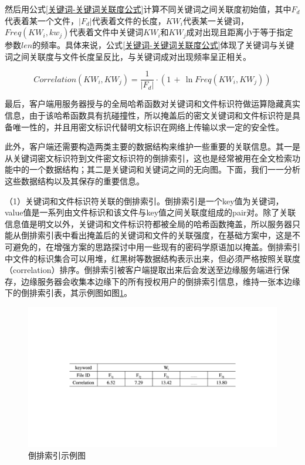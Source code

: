 \documentclass[promaster]{thesis-uestc}
\begin{document}
然后用公式\ref{关键词-关键词关联度公式}计算不同关键词之间关联度初始值，其中$F_d$代表着某一个文件，$|F_d|$代表着文件的长度，$KW_i$代表某一关键词，$Freq(KW_i, kw_j)$代表着文件中关键词$KW_i$和$KW_j$成对出现且距离小于等于指定参数$len$的频率。具体来说，公式\ref{关键词-关键词关联度公式}体现了关键词与关键词之间关联度与文件长度呈反比，与关键词成对出现频率呈正相关。

\begin{equation}
    Correlation(KW_i, KW_j) = \frac{1}{|F_d|} \cdot (1\,+\,\ln{Freq(KW_i, KW_j)})
    \label{关键词-关键词关联度公式}
\end{equation}

最后，客户端用服务器授与的全局哈希函数对关键词和文件标识符做运算隐藏真实信息，由于该哈希函数具有抗碰撞性，所以掩盖后的密文关键词和文件标识符是具备唯一性的，并且用密文标识代替明文标识在网络上传输以求一定的安全性。

此外，客户端还需要构造两类主要的数据结构来维护一些重要的关联信息。其一是从关键词密文标识符到文件密文标识符的倒排索引，这也是经常被用在全文检索功能中的一个数据结构；其二是关键词和关键词之间的无向图。下面，我们一一分析这些数据结构以及其保存的重要信息。

（1）关键词和文件标识符关联的倒排索引。倒排索引是一个key值为关键词，value值是一系列由文件标识和该文件与key值之间关联度组成的pair对。除了关联信息值是明文以外，关键词和文件标识符都被全局的哈希函数掩盖，所以服务器只能从倒排索引表中看出掩盖后的关键词和文件的关联强度，在基础方案中，这是不可避免的，在增强方案的思路探讨中用一些现有的密码学原语加以掩盖。倒排索引中文件的标识集合可以用堆，红黑树等数据结构表示出来，但必须严格按照关联度（correlation）排序。倒排索引被客户端提取出来后会发送至边缘服务端进行保存，边缘服务器会收集本边缘下的所有授权用户的倒排索引信息，维持一张本边缘下的倒排索引表，其示例图如图\ref{倒排索引示例图}。
\begin{figure}[htbp] 
    \centering  
    \includegraphics[width = 1.0\linewidth]{pic/倒排索引示例图.pdf}  
    \caption{倒排索引示例图} 
    \label{倒排索引示例图}  
\end{figure}
\end{document}
